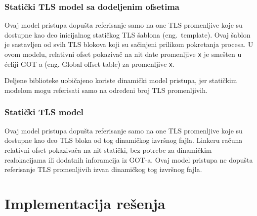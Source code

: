 \documentclass[12pt,oneside]{memoir}
\begin{document}
\subsection{Statički TLS model sa dodeljenim ofsetima}

Ovaj model pristupa dopušta referisanje samo na one TLS promenljive koje su dostupne kao deo inicijalnog statičkog TLS šablona (eng.~template). Ovaj šablon je sastavljen od svih TLS blokova koji su sačinjeni prilikom pokretanja procesa. U ovom modelu, relativni ofset pokazivač na nit date promenljive \texttt{x} je smešten u ćeliji GOT-a (eng. Global offset table) za promenljive \texttt{x}.

Deljene biblioteke uobičajeno koriste dinamički model pristupa, jer statičkim modelom mogu referisati samo na određeni broj TLS promenljivih.

\subsection{Statički TLS model}

Ovaj model pristupa dopušta referisanje samo na one TLS promenljive koje su dostupne kao deo TLS bloka od tog dinamičkog izvršnog fajla. Linkeru računa relativni ofset pokazivača na nit statički, bez potrebe za dinamičkim realokacijama ili dodatnih inforamcija iz GOT-a. Ovaj model pristupa ne dopušta referisanje TLS promenljivih izvan dinamičkog tog izvršnog fajla.

\chapter{Implementacija rešenja}
\label{chp:Implementacija}
\end{document}
